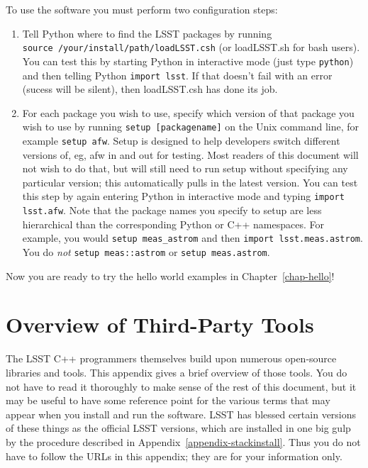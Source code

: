 \documentclass{book}
\def\t{\texttt}
\begin{document}
To use the software you must perform two configuration steps:
\begin{enumerate}
\item Tell Python where to find the LSST packages by
  running \\ \texttt{source /your/install/path/loadLSST.csh} (or loadLSST.sh
  for bash users).  You can test this by starting Python in
  interactive mode (just type \texttt{python}) and then telling Python
  \texttt{import lsst}.  If that doesn't fail with an error (sucess
  will be silent), then loadLSST.csh has done its job.

\item For each package you wish to use, specify which version of that
  package you wish to use by running \texttt{setup [packagename]} on the
  Unix command line, for example \texttt{setup afw}.  Setup is designed to
  help developers switch different versions of, eg, afw in and out for
  testing.  Most readers of this document will not wish to do that,
  but will still need to run setup without specifying any particular
  version; this automatically pulls in the latest version.  You can
  test this step by again entering Python in interactive mode and
  typing \texttt{import lsst.afw}.  Note that the package names you specify
  to setup are less hierarchical than the corresponding Python or C++
  namespaces.  For example, you would \t{setup meas\_astrom} and then
  \t{import lsst.meas.astrom}.  You do {\it not} \t{setup meas::astrom} or 
  \t{setup meas.astrom}.

\end{enumerate}

Now you are ready to try the hello world examples in
Chapter~\ref{chap-hello}! 


\chapter{Overview of Third-Party Tools\label{appendix-thirdparty}}

The LSST C++ programmers themselves build upon numerous open-source
libraries and tools.  This appendix gives a brief overview of those
tools.  You do not have to read it thoroughly to make sense of the
rest of this document, but it may be useful to have some reference
point for the various terms that may appear when you install and run
the software.  LSST has blessed certain versions of these things as
the official LSST versions, which are installed in one big gulp by the
procedure described in Appendix~\ref{appendix-stackinstall}.  Thus you
do not have to follow the URLs in this appendix; they are for your
information only.
\end{document}
